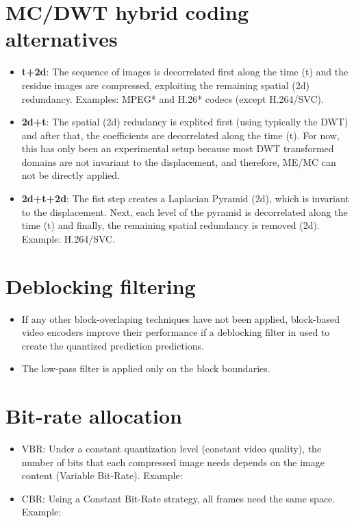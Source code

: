 \section{MC/DWT hybrid coding alternatives}
\begin{itemize}
\item
  \textbf{t+2d}: The sequence of images is decorrelated first along the
  time (t) and the residue images are compressed, exploiting the
  remaining spatial (2d) redundancy. Examples: MPEG* and H.26* codecs
  (except H.264/SVC).
\item
  \textbf{2d+t}: The spatial (2d) redudancy is explited first (using
  typically the DWT) and after that, the coefficients are decorrelated
  along the time (t). For now, this has only been an experimental setup
  because most DWT transformed domains are not invariant to the
  displacement, and therefore, ME/MC can not be directly applied.
\item
  \textbf{2d+t+2d}: The fist step creates a Laplacian Pyramid (2d),
  which is invariant to the displacement. Next, each level of the
  pyramid is decorrelated along the time (t) and finally, the remaining
  spatial redundancy is removed (2d). Example: H.264/SVC.
\end{itemize}


\section{Deblocking filtering}
\begin{itemize}
\tightlist
\item
  If any other block-overlaping techniques have not been applied,
  block-based video encoders improve their performance if a deblocking
  filter in used to create the quantized prediction predictions.
\end{itemize}


\begin{itemize}
\tightlist
\item
  The low-pass filter is applied only on the block boundaries.
\end{itemize}

\section{Bit-rate allocation}
\begin{itemize}
\item
  VBR: Under a constant quantization level (constant video quality), the
  number of bits that each compressed image needs depends on the image
  content (Variable Bit-Rate). Example:

\item
  CBR: Using a Constant Bit-Rate strategy, all frames need the same
  space. Example:
\end{itemize}

